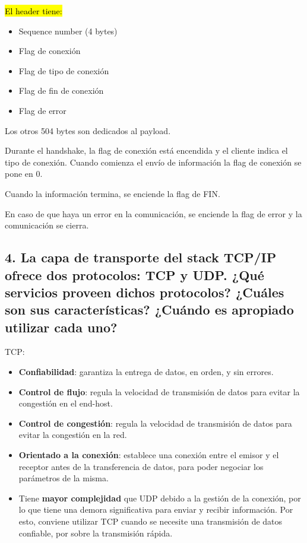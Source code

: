 \documentclass{article}
\begin{document}
\hl{El header tiene:}

\begin{itemize}
\item
  Sequence number (4 bytes)
\item
  Flag de conexión
\item
  Flag de tipo de conexión
\item
  Flag de fin de conexión
\item
  Flag de error
\end{itemize}

Los otros 504 bytes son dedicados al payload.

Durante el handshake, la flag de conexión está encendida y el cliente indica el tipo de conexión. Cuando comienza el envío de información la flag de conexión se pone en 0.

Cuando la información termina, se enciende la flag de FIN.

En caso de que haya un error en la comunicación, se enciende la flag de error y la comunicación se cierra.

\subsection{\texorpdfstring{\textbf{4. La capa de transporte del stack
TCP/IP ofrece dos protocolos: TCP y UDP. ¿Qué servicios proveen dichos
protocolos? ¿Cuáles son sus características? ¿Cuándo es apropiado
utilizar cada
uno?}}{4. La capa de transporte del stack TCP/IP ofrece dos protocolos: TCP y UDP. ¿Qué servicios proveen dichos protocolos? ¿Cuáles son sus características? ¿Cuándo es apropiado utilizar cada uno?}}\label{la-capa-de-transporte-del-stack-tcpip-ofrece-dos-protocolos-tcp-y-udp.-quuxe9-servicios-proveen-dichos-protocolos-cuuxe1les-son-sus-caracteruxedsticas-cuuxe1ndo-es-apropiado-utilizar-cada-uno}

TCP:

\begin{itemize}
\item
  \textbf{Confiabilidad}: garantiza la entrega de datos, en orden, y sin
  errores.
\end{itemize}

\begin{itemize}
\item
  \textbf{Control de flujo}: regula la velocidad de transmisión de datos
  para evitar la congestión en el end-host.
\item
  \textbf{Control de congestión}: regula la velocidad de transmisión de
  datos para evitar la congestión en la red.
\item
  \textbf{Orientado a la conexión}: establece una conexión entre el
  emisor y el receptor antes de la transferencia de datos, para poder
  negociar los parámetros de la misma.
\item
  Tiene \textbf{mayor complejidad} que UDP debido a la gestión de la
  conexión, por lo que tiene una demora significativa para enviar y
  recibir información. Por esto, conviene utilizar TCP cuando se
  necesite una transmisión de datos confiable, por sobre la transmisión
  rápida.
\end{itemize}
\end{document}

